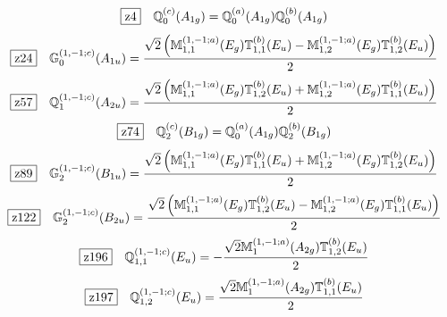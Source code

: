 \documentclass[fleqn,10pt,landscape]{jsarticle}
\begin{document}
\begin{dmath*}
\hspace*{3mm}\fbox{z4}\quad \mathbb{Q}_{0}^{(c)}(A_{1g})=\mathbb{Q}_{0}^{(a)}(A_{1g}) \mathbb{Q}_{0}^{(b)}(A_{1g})
\end{dmath*}
\begin{dmath*}
\hspace*{3mm}\fbox{z24}\quad \mathbb{G}_{0}^{(1,-1;c)}(A_{1u})=\frac{\sqrt{2} \left(\mathbb{M}_{1,1}^{(1,-1;a)}(E_{g}) \mathbb{T}_{1,1}^{(b)}(E_{u}) - \mathbb{M}_{1,2}^{(1,-1;a)}(E_{g}) \mathbb{T}_{1,2}^{(b)}(E_{u})\right)}{2}
\end{dmath*}
\begin{dmath*}
\hspace*{3mm}\fbox{z57}\quad \mathbb{Q}_{1}^{(1,-1;c)}(A_{2u})=\frac{\sqrt{2} \left(\mathbb{M}_{1,1}^{(1,-1;a)}(E_{g}) \mathbb{T}_{1,2}^{(b)}(E_{u}) + \mathbb{M}_{1,2}^{(1,-1;a)}(E_{g}) \mathbb{T}_{1,1}^{(b)}(E_{u})\right)}{2}
\end{dmath*}
\begin{dmath*}
\hspace*{3mm}\fbox{z74}\quad \mathbb{Q}_{2}^{(c)}(B_{1g})=\mathbb{Q}_{0}^{(a)}(A_{1g}) \mathbb{Q}_{2}^{(b)}(B_{1g})
\end{dmath*}
\begin{dmath*}
\hspace*{3mm}\fbox{z89}\quad \mathbb{G}_{2}^{(1,-1;c)}(B_{1u})=\frac{\sqrt{2} \left(\mathbb{M}_{1,1}^{(1,-1;a)}(E_{g}) \mathbb{T}_{1,1}^{(b)}(E_{u}) + \mathbb{M}_{1,2}^{(1,-1;a)}(E_{g}) \mathbb{T}_{1,2}^{(b)}(E_{u})\right)}{2}
\end{dmath*}
\begin{dmath*}
\hspace*{3mm}\fbox{z122}\quad \mathbb{G}_{2}^{(1,-1;c)}(B_{2u})=\frac{\sqrt{2} \left(\mathbb{M}_{1,1}^{(1,-1;a)}(E_{g}) \mathbb{T}_{1,2}^{(b)}(E_{u}) - \mathbb{M}_{1,2}^{(1,-1;a)}(E_{g}) \mathbb{T}_{1,1}^{(b)}(E_{u})\right)}{2}
\end{dmath*}
\begin{dmath*}
\hspace*{3mm}\fbox{z196}\quad \mathbb{Q}_{1,1}^{(1,-1;c)}(E_{u})=- \frac{\sqrt{2} \mathbb{M}_{1}^{(1,-1;a)}(A_{2g}) \mathbb{T}_{1,2}^{(b)}(E_{u})}{2}
\end{dmath*}
\begin{dmath*}
\hspace*{3mm}\fbox{z197}\quad \mathbb{Q}_{1,2}^{(1,-1;c)}(E_{u})=\frac{\sqrt{2} \mathbb{M}_{1}^{(1,-1;a)}(A_{2g}) \mathbb{T}_{1,1}^{(b)}(E_{u})}{2}
\end{dmath*}
\vspace{5mm}
\end{document}
